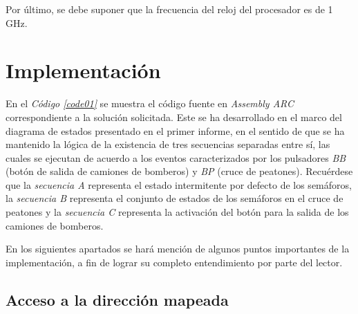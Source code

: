 \documentclass{article}
\newcommand{\refcode}[1]{\textit{Código \ref{#1}}}
\begin{document}
	Por último, se debe suponer que la frecuencia del reloj del procesador es de 1 GHz.




\section{Implementación}
\medskip

	En el \refcode{code01} se muestra el código fuente en \textit{Assembly ARC} correspondiente a la solución solicitada. Este se ha desarrollado en el marco del diagrama de estados presentado en el primer informe, en el sentido de que se ha mantenido la lógica de la existencia de tres secuencias separadas entre sí, las cuales se ejecutan de acuerdo a los eventos caracterizados por los pulsadores \textit{BB} (botón de salida de camiones de bomberos) y \textit{BP} (cruce de peatones). Recuérdese que la \textit{secuencia A} representa el estado intermitente por defecto de los semáforos, la \textit{secuencia B} representa el conjunto de estados de los semáforos en el cruce de peatones y la \textit{secuencia C} representa la activación del botón para la salida de los camiones de bomberos.
\bigskip


\lstset{language=[ARC]Assembler} %
 
\bigskip\bigskip\bigskip


	En los siguientes apartados se hará mención de algunos puntos importantes de la implementación, a fin de lograr su completo entendimiento por parte del lector.
\bigskip\bigskip



\subsection{Acceso a la dirección mapeada}
\medskip
	
\end{document}
